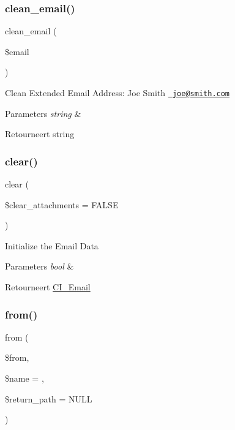\subsubsection{\texorpdfstring{clean\_email()}{clean\_email()}}
{\footnotesize\ttfamily clean\+\_\+email (\begin{DoxyParamCaption}\item[{}]{\$email }\end{DoxyParamCaption})}

Clean Extended Email Address\+: Joe Smith \href{mailto:joe@smith.com}{\texttt{ joe@smith.\+com}}


\begin{DoxyParams}{Parameters}
{\em string} & \\
\hline
\end{DoxyParams}
\begin{DoxyReturn}{Retourneert}
string 
\end{DoxyReturn}
\mbox{\label{class_c_i___email_a84399b20dfff67877099743270c68538}} 
\subsubsection{\texorpdfstring{clear()}{clear()}}
{\footnotesize\ttfamily clear (\begin{DoxyParamCaption}\item[{}]{\$clear\+\_\+attachments = {\ttfamily FALSE} }\end{DoxyParamCaption})}

Initialize the Email Data


\begin{DoxyParams}{Parameters}
{\em bool} & \\
\hline
\end{DoxyParams}
\begin{DoxyReturn}{Retourneert}
\mbox{\hyperlink{class_c_i___email}{C\+I\+\_\+\+Email}} 
\end{DoxyReturn}
\mbox{\label{class_c_i___email_adfec40d06e4f3fcae4e2059dee1c26d0}} 
\subsubsection{\texorpdfstring{from()}{from()}}
{\footnotesize\ttfamily from (\begin{DoxyParamCaption}\item[{}]{\$from,  }\item[{}]{\$name = {\ttfamily \textquotesingle{}\textquotesingle{}},  }\item[{}]{\$return\+\_\+path = {\ttfamily NULL} }\end{DoxyParamCaption})}


